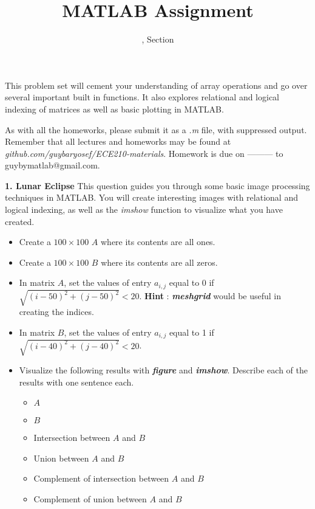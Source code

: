 \documentclass[11pt]{article}
\title{MATLAB Assignment \Homework}
\author{\Session, Section \Section}
\date{}
\makeatletter
\def\MyEmail{guybymatlab@gmail.com}
\def\DateOfSubmission{ --------- }
\makeatother
\begin{document}
\maketitle
This problem set will cement your understanding of array operations and go over 
several important built in functions.
It also explores relational and logical indexing of matrices as well as basic plotting in MATLAB.

As with all the homeworks, please submit it as a \textit{.m} file, 
with suppressed output.
Remember that all lectures and homeworks may be found at 
\textit{github.com/guybaryosef/ECE210-materials}.
Homework is due on \DateOfSubmission to \MyEmail. 

\noindent
\newline
\textbf{1. Lunar Eclipse} 
This question guides you through some basic image processing techniques in MATLAB.
You will create interesting images with relational and logical indexing,
as well as the \emph{imshow} function to visualize what you have created. 

\begin{itemize}
    \item Create a $100 \times 100$ $A$ where its contents are all ones.

    \item Create a $100 \times 100$ $B$ where its contents are all zeros.

    \item In matrix $A$, set the values of entry $a_{i,j}$ equal to 0 if $\sqrt{(i-50)^2 + (j-50)^2} < 20$.
    \textbf{Hint} : \textbf{\textit{meshgrid}} would be useful in creating the indices.

    \item In matrix $B$, set the values of entry $a_{i,j}$ equal to 1 if $\sqrt{(i-40)^2 + (j-40)^2} < 20$.

    \item Visualize the following results with \textbf{\textit{figure}} and \textbf{\textit{imshow}}. 
    Describe each of the results with one sentence each. 

        \begin{itemize}
        \item $A$
        \item $B$
        \item Intersection between $A$ and $B$
        \item Union between $A$ and $B$
        \item Complement of intersection between $A$ and $B$
        \item Complement of union between $A$ and $B$
        \end{itemize}
\end{itemize}
\end{document}
